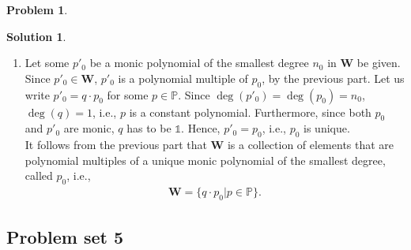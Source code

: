 \documentclass{article}
\theoremstyle{definition}
\newtheorem*{prob*}{Problem}
\newtheorem*{sln*}{Solution}
\newcommand{\W}{\mathbf{W}}
\begin{document}
\begin{prob*}
\begin{sln*}
\begin{enumerate}
		
		\item Let some $p'_0$ be a monic polynomial of the smallest degree $n_0$ in $\W$ be given. Since $p'_0 \in \W$, $p'_0$ is a polynomial multiple of $p_0$, by the previous part. Let us write $p'_0 = q\cdot p_0$ for some $p\in \mathbb{P}$. Since $\deg(p'_0) = \deg(p_0) = n_0$, $\deg(q) = 1$, i.e., $p$ is a constant polynomial. Furthermore, since both $p_0$ and $p'_0$ are monic, $q$ has to be $\mathbb{1}$. Hence, $p'_0 = p_0$, i.e., $p_0$ is unique.\\
		
		It follows from the previous part that $\W$ is a collection of elements that are polynomial multiples of a unique monic polynomial of the smallest degree, called $p_0$, i.e.,
		\begin{align*}
		\W = \{ q\cdot p_0 \big\vert p \in \mathbb{P} \}.
		\end{align*}
	\end{enumerate}
\end{sln*}
\end{prob*}






















\newpage














\subsection{Problem set 5}
\end{document}
